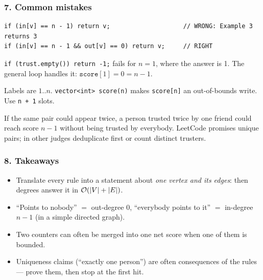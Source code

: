 \subsubsection*{7. Common mistakes}

\begin{warningbox}
\begin{lstlisting}[style=snippet]
if (in[v] == n - 1) return v;                    // WRONG: Example 3 returns 3
if (in[v] == n - 1 && out[v] == 0) return v;     // RIGHT
\end{lstlisting}
\end{warningbox}

\begin{warningbox}
\texttt{if (trust.empty()) return -1;} fails for $n = 1$, where the answer is 1. The general loop handles it: $\texttt{score}[1] = 0 = n - 1$.
\end{warningbox}

\begin{warningbox}
Labels are $1..n$. \texttt{vector<int> score(n)} makes \texttt{score[n]} an out-of-bounds write. Use \texttt{n + 1} slots.
\end{warningbox}

\begin{warningbox}
If the same pair could appear twice, a person trusted twice by one friend could reach score $n-1$ without being trusted by everybody. LeetCode promises unique pairs; in other judges deduplicate first or count distinct trusters.
\end{warningbox}

\subsubsection*{8. Takeaways}

\begin{itemize}[leftmargin=*]
    \item Translate every rule into a statement about \emph{one vertex and its edges}: then degrees answer it in $\mathcal{O}(|V|+|E|)$.
    \item ``Points to nobody'' $=$ out-degree 0, ``everybody points to it'' $=$ in-degree $n-1$ (in a simple directed graph).
    \item Two counters can often be merged into one net score when one of them is bounded.
    \item Uniqueness claims (``exactly one person'') are often consequences of the rules --- prove them, then stop at the first hit.
\end{itemize}

